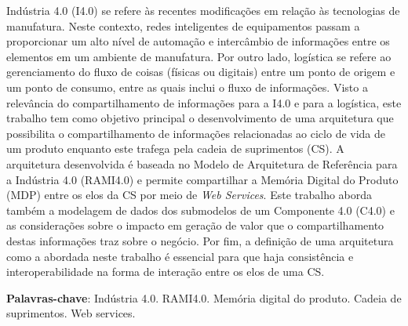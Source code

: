 \setlength{\absparsep}{18pt} %
\begin{resumo}
	Indústria 4.0 (I4.0) se refere às recentes modificações em relação às tecnologias de manufatura. Neste contexto, redes inteligentes de equipamentos passam a proporcionar um alto nível de automação e intercâmbio de informações entre os elementos em um ambiente de manufatura. Por outro lado, logística se refere ao gerenciamento do fluxo de coisas (físicas ou digitais) entre um ponto de origem e um ponto de consumo, entre as quais inclui o fluxo de informações. Visto a relevância do compartilhamento de informações para a I4.0 e para a logística, este trabalho tem como objetivo principal o desenvolvimento de uma arquitetura que possibilita o compartilhamento de informações relacionadas ao ciclo de vida de um produto enquanto este trafega pela cadeia de suprimentos (CS). A arquitetura desenvolvida é baseada no Modelo de Arquitetura de Referência para a Indústria 4.0 (RAMI4.0) e permite compartilhar a Memória Digital do Produto (MDP) entre os elos da CS por meio de \textit{Web Services}. Este trabalho aborda também a modelagem de dados dos submodelos de um Componente 4.0 (C4.0) e as considerações sobre o impacto em geração de valor que o compartilhamento destas informações traz sobre o negócio. Por fim, a definição de uma arquitetura como a abordada neste trabalho é essencial para que haja consistência e interoperabilidade na forma de interação entre os elos de uma CS.

	\vspace{\onelineskip}

	\noindent
	\textbf{Palavras-chave}: Indústria 4.0. RAMI4.0. Memória digital do produto. Cadeia de suprimentos. Web services.
\end{resumo}

